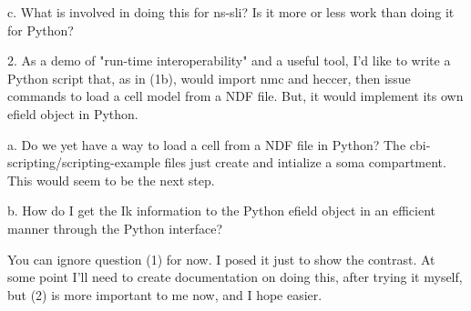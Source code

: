 \documentclass[12pt]{article}
\begin{document}
   c.  What is involved in doing this for ns-sli?  Is it more or
   less work than doing it for Python?

2.  As a demo of "run-time interoperability" and a useful tool, I'd
like to write a Python script that, as in (1b), would import nmc and
heccer, then issue commands to load a cell model from a NDF file.
But, it would implement its own efield object in Python.

   a.  Do we yet have a way to load a cell from a NDF file in Python?
   The cbi-scripting/scripting-example files just create and intialize
   a soma compartment.  This would seem to be the next step.

   b.  How do I get the Ik information to the Python efield object in an
   efficient manner through the Python interface?

You can ignore question (1) for now.  I posed it just to show the contrast.
At some point I'll need to create documentation on doing this, after trying
it myself, but (2) is more important to me now, and I hope easier.





\end{document}
